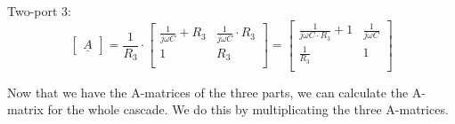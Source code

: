 \documentclass[a4paper]{article}
\begin{document}
Two-port 3:\\
\begin{equation*}
	\begin{bmatrix}
		\underline{A}
	\end{bmatrix}=
	\frac{1}{R_3} \cdot
	\begin{bmatrix}
		\frac{1}{j\omega C} + R_3 & \frac{1}{j\omega C} \cdot R_3\\
		1 & R_3\\
	\end{bmatrix} =
	\begin{bmatrix}
		\frac{1}{j\omega C \cdot R_3} + 1 & \frac{1}{j\omega C}\\
		\frac{1}{R_3} & 1\\
	\end{bmatrix}
\end{equation*}

Now that we have the A-matrices of the three parts, we can calculate the A-matrix for the whole
cascade. We do this by multiplicating the three A-matrices.
\end{document}
